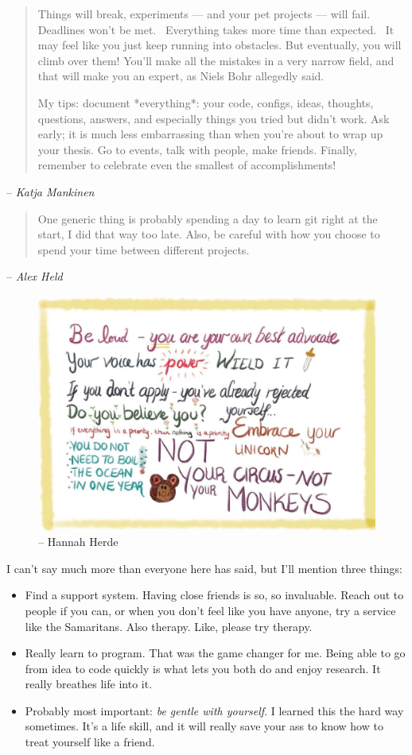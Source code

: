 \documentclass[
  11pt,
  numbers=noendperiod]{book}
\begin{document}
\begin{quote}
    Things will break, experiments — and your pet projects — will fail. Deadlines won't be met. 
Everything takes more time than expected. 
It may feel like you just keep running into obstacles. But eventually, you will climb over them! You'll make all the mistakes in a very narrow field, and that will make you an expert, as Niels Bohr allegedly said. 

My tips: document *everything*: your code, configs, ideas, thoughts, questions, answers, and especially things you tried but didn't work. Ask early; it is much less embarrassing than when you're about to wrap up your thesis. Go to events, talk with people, make friends. Finally, remember to celebrate even the smallest of accomplishments! 
\end{quote}
\hfill-- \textit{Katja Mankinen}
\begin{quote}
    One generic thing is probably spending a day to learn git right at the start, I did that way too late. Also, be careful with how you choose to spend your time between different projects.
\end{quote}
\hfill -- \textit{Alex Held}

\begin{figure}
    \centering
    \includegraphics{images/hannah.jpg}
    \caption*{\hfill-- Hannah Herde}
\end{figure}

I can't say much more than everyone here has said, but I'll mention three things:
\begin{itemize}
    \item Find a support system. Having close friends is so, so invaluable. Reach out to people if you can, or when you don't feel like you have anyone, try a service like the Samaritans. Also therapy. Like, please try therapy.
    \item Really learn to program. That was the game changer for me. Being able to go from idea to code quickly is what lets you both do and enjoy research. It really breathes life into it.
    \item Probably most important:\textit{ be gentle with yourself}. I learned this the hard way sometimes. It's a life skill, and it will really save your ass to know how to treat yourself like a friend.
\end{itemize}
\end{document}
